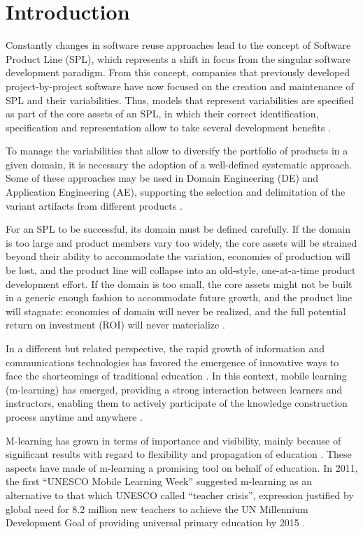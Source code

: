 \section{Introduction}

Constantly changes in software reuse approaches lead to the concept of Software Product Line (SPL), which represents a shift in focus from the singular software development paradigm. From this concept, companies that previously developed project-by-project software have now focused on the creation and maintenance of SPL and their variabilities. Thus, models that represent variabilities are specified as part of the core assets of an SPL, in which their correct identification, specification and representation allow to take several development benefits \cite{chen11, capilla13}.

To manage the variabilities that allow to diversify the portfolio of products in a given domain, it is necessary the adoption of a well-defined systematic approach. Some of these approaches may be used in Domain Engineering (DE) and Application Engineering (AE), supporting the selection and delimitation of the variant artifacts from different products \cite{bockle05, vanderlinden07}.

For an SPL to be successful, its domain must be defined carefully. If the domain is too large and product members vary too widely, the core assets will be strained beyond their ability to accommodate the variation, economies of production will be lost, and the product line will collapse into an old-style, one-at-a-time product development effort. If the domain is too small, the core assets might not be built in a generic enough fashion to accommodate future growth, and the product line will stagnate: economies of domain will never be realized, and the full potential return on investment (ROI) will never materialize \cite{bockle05, vanderlinden07}.

In a different but related perspective, the rapid growth of information and communications technologies has favored the emergence of innovative ways to face the shortcomings of traditional education \cite{west12}. In this context, mobile learning (m-learning) has emerged, providing a strong interaction between learners and instructors, enabling them to actively participate of the knowledge construction process anytime and anywhere \cite{kukulska05}. 

M-learning has grown in terms of importance and visibility, mainly because of significant results with regard to flexibility and propagation of education \cite{kinshuk03, wexler08}. These aspects have made of m-learning a promising tool on behalf of education. In 2011, the first ``UNESCO Mobile Learning Week'' suggested m-learning as an alternative to that which UNESCO called ``teacher crisis'', expression justified by global need for 8.2 million new teachers to achieve the UN Millennium Development Goal of providing universal primary education by 2015 \cite{west12}.

